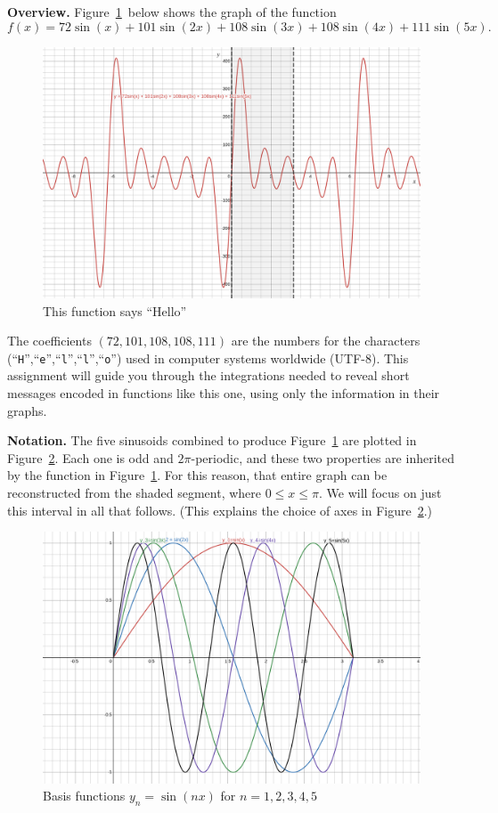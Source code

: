 \documentclass{exam}
\begin{document}
\noindent
\textbf{Overview.}
Figure~\ref{fig:hellosmooth}\ below shows the graph of the function
\[
f(x) 
= 72\sin(x) + 101\sin(2x) + 108\sin(3x) + 108\sin(4x) + 111\sin(5x).
\]
\begin{figure}[!ht]
\centering
\includegraphics[scale=0.12]{hello-smooth.png}
\caption{This function says ``Hello''}
\label{fig:hellosmooth}
\end{figure}
The coefficients $(72,101,108,108,111)$ are the numbers 
for the characters 
(``\texttt{H}'',``\texttt{e}'',``\texttt{l}'',``\texttt{l}'',``\texttt{o}'')
used in computer systems worldwide (UTF-8).
This assignment will guide you through the integrations needed 
to reveal short messages encoded in functions like this one,
using only the information in their graphs.

\medskip\noindent\textbf{Notation.}
The five sinusoids combined to produce Figure~\ref{fig:hellosmooth}
are plotted in Figure~\ref{fig:FSSbasis}.
Each one is odd and $2\pi$-periodic,
and these two properties are inherited by 
the function in Figure~\ref{fig:hellosmooth}.
For this reason, 
that entire graph can be reconstructed from
the shaded segment, where $0\le x\le \pi$.
We will focus on just this interval in all that follows.
(This explains the choice of axes in Figure~\ref{fig:FSSbasis}.)


\begin{figure}[!ht]
\centering
\includegraphics[scale=0.12]{FSS-basis.png}
\caption{Basis functions $y_n=\sin(nx)$ for $n=1,2,3,4,5$}
\label{fig:FSSbasis}
\end{figure}
\end{document}
